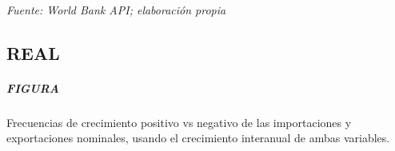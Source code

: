 \documentclass[12pt]{book}
\begin{document}
    \begin{center}
    \end{center}
    { \hspace*{\fill} \\}

    \emph{Fuente: World Bank API; elaboración propia}

    \subsection{REAL}\label{real}

    \subparagraph{FIGURA}\label{figura}

Frecuencias de crecimiento positivo vs negativo de las importaciones y
exportaciones nominales, usando el crecimiento interanual de ambas
variables.
\end{document}
